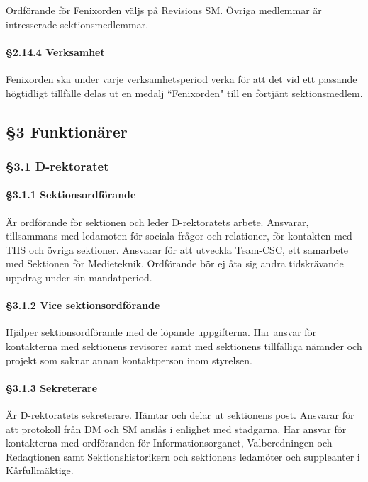 Ordförande för Fenixorden väljs på Revisions SM. Övriga medlemmar är intresserade sektionsmedlemmar.

\paragraph{§2.14.4 Verksamhet}

Fenixorden ska under varje verksamhetsperiod verka för att det vid ett passande högtidligt tillfälle delas ut en medalj ``Fenixorden" till en förtjänt sektionsmedlem.

\subsection{§3 Funktionärer}

\subsubsection{§3.1 D-rektoratet}

\paragraph{§3.1.1 Sektionsordförande}

Är ordförande för sektionen och leder D-rektoratets arbete. Ansvarar, tillsammans med ledamoten för sociala frågor och relationer, för kontakten med THS och övriga sektioner. Ansvarar för att utveckla Team-CSC, ett samarbete med Sektionen för Medieteknik. Ordförande bör ej åta sig andra tidskrävande uppdrag under sin mandatperiod.

\paragraph{§3.1.2 Vice sektionsordförande}

Hjälper sektionsordförande med de löpande uppgifterna. Har ansvar för kontakterna med sektionens revisorer samt med sektionens tillfälliga nämnder och projekt som saknar annan kontaktperson inom styrelsen.

\paragraph{§3.1.3 Sekreterare}

Är D-rektoratets sekreterare. Hämtar och delar ut sektionens post. Ansvarar för att protokoll från DM och SM anslås i enlighet med stadgarna. Har ansvar för kontakterna med ordföranden för Informationsorganet, Valberedningen och Redaqtionen samt Sektionshistorikern och sektionens ledamöter och suppleanter i Kårfullmäktige.

